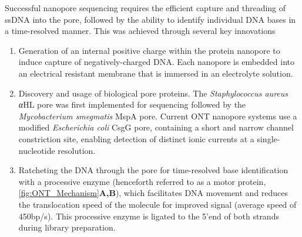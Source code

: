 Successful nanopore sequencing requires the efficient capture and threading of ssDNA into the pore, followed by the ability to identify individual DNA bases in a time-resolved manner. This was achieved through several key innovations\cite{Bayley2015} 
\begin{enumerate}
	\item Generation of an internal positive charge within the protein nanopore to induce capture of negatively-charged DNA. Each nanopore is embedded into an electrical resistant membrane that is immersed in an electrolyte solution.
	\item Discovery and usage of biological pore proteins. The \textit{Staphylococcus aureus} \textit{α}HL pore was first implemented for sequencing\cite{N2005} followed by the \textit{Mycobacterium smegmatis} MspA pore\cite{Manrao2011}. Current ONT nanopore systems use a modified \textit{Escherichia coli} CsgG pore, containing a short and narrow channel constriction site, enabling detection of distinct ionic currents at a single-nucleotide resolution. 
	\item Ratcheting the DNA through the pore for time-resolved base identification with a processive enzyme (henceforth referred to as a motor protein, \cref{fig:ONT_Mechanism}\textbf{A,B}), which facilitates DNA movement and reduces the translocation speed of the molecule for improved signal (average speed of 450bp/s)\cite{Rang2018}. This processive enzyme is ligated to the 5'end of both strands during library preparation.   
\end{enumerate}

